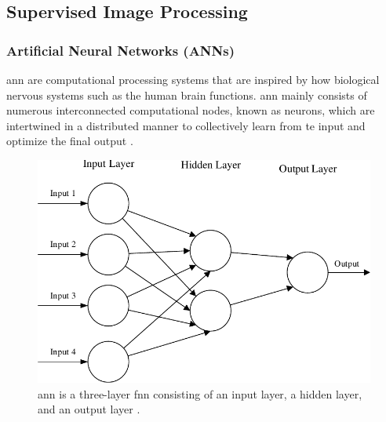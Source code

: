 

\subsection{Supervised Image Processing}

\subsubsection{Artificial Neural Networks (ANNs)}

\gls{ann} are computational processing systems that are inspired by how biological nervous systems such as the human brain functions. \gls{ann} mainly consists of numerous interconnected computational nodes, known as neurons, which are intertwined in a distributed manner to collectively learn from te input and optimize the final output \cite{oshea2015introductionconvolutionalneuralnetworks}.

\begin{figure}[ht!]
    \centering
    \includegraphics[width=1\linewidth]{Images/ann_architecture.pdf}
    \caption{\gls{ann} is a three-layer \gls{fnn} consisting of an input layer, a hidden layer, and an output layer \cite{oshea2015introductionconvolutionalneuralnetworks}.}
    \label{fig:ann architecture}
\end{figure}

